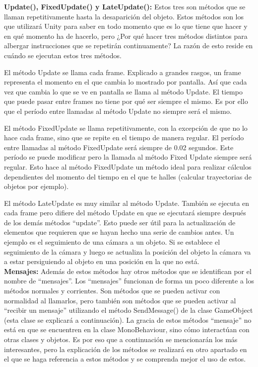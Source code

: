 \textbf{Update(), FixedUpdate() y LateUpdate():} Estos tres son métodos que se llaman repetitivamente hasta la desaparición del objeto. Estos métodos son los que utilizará Unity para saber en todo momento que es lo que tiene que hacer y en qué momento ha de hacerlo, pero ¿Por qué hacer tres métodos distintos para albergar instrucciones que se repetirán continuamente? La razón de esto reside en cuándo se ejecutan estos tres métodos.

El método Update se llama cada frame. Explicado a grandes rasgos, un frame representa el momento en el que cambia lo mostrado por pantalla. Así que cada vez que cambia lo que se ve en pantalla se llama al método Update. El tiempo que puede pasar entre frames no tiene por qué ser siempre el mismo. Es por ello que el período entre llamadas al método Update no siempre será el mismo.

El método FixedUpdate se llama repetitivamente, con la excepción de que no lo hace cada frame, sino que se repite en el tiempo de manera regular. El período entre llamadas al método FixedUpdate será siempre de 0.02 segundos. Este período se puede modificar pero la llamada al método Fixed Update siempre será regular. Esto hace al método FixedUpdate un método ideal para realizar cálculos dependientes del momento del tiempo en el que te halles (calcular trayectorias de objetos por ejemplo).

El método LateUpdate es muy similar al método Update. También se ejecuta en cada frame pero difiere del método Update en que se ejecutará siempre después de los demás métodos “update”. Esto puede ser útil para la actualización de elementos que requieren que se hayan hecho una serie de cambios antes. Un ejemplo es el seguimiento de una cámara a un objeto. Si se establece el seguimiento de la cámara y luego se actualiza la posición del objeto la cámara va a estar persiguiendo al objeto en una posición en la que no está.\\


\textbf{Mensajes:} Además de estos métodos hay otros métodos que se identifican por el nombre de “mensajes”. Los “mensajes” funcionan de forma un poco diferente a los métodos normales y corrientes. Son métodos que se pueden activar con normalidad al llamarlos, pero también son métodos que se pueden activar al “recibir un mensaje” utilizando el método SendMessage() de la clase GameObject (esta clase se explicará a continuación). La gracia de estos métodos “mensaje” no está en que se encuentren en la clase MonoBehaviour, sino cómo interactúan con otras clases y objetos. Es por eso que a continuación se mencionarán los más interesantes, pero la explicación de los métodos se realizará en otro apartado en el que se haga referencia a estos métodos y se comprenda mejor el uso de estos.

